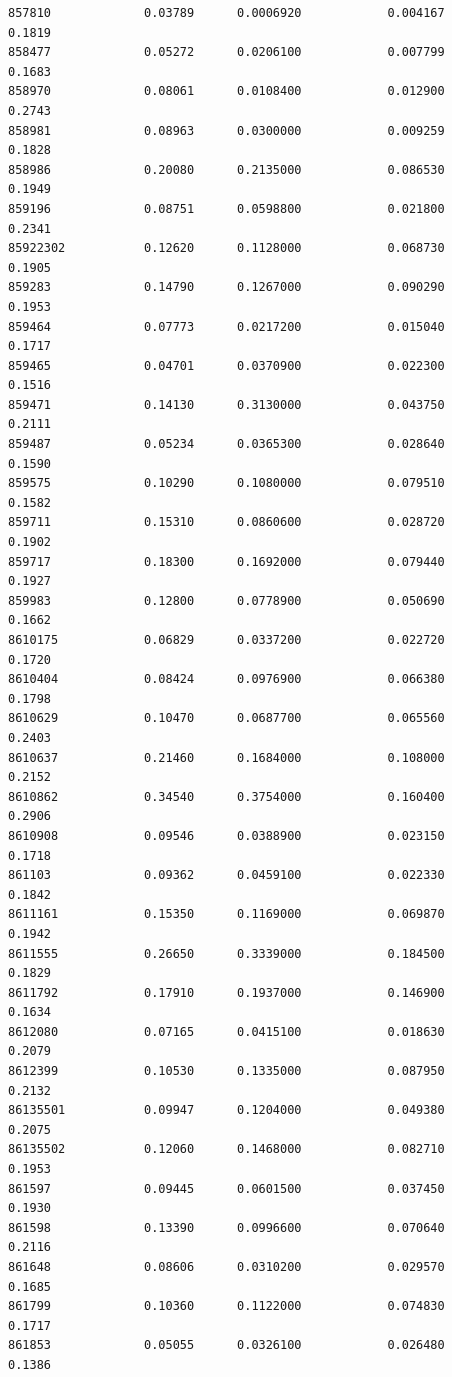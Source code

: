 \documentclass[
  letterpaper,
  DIV=11,
  numbers=noendperiod]{scrartcl}
\begin{document}
\begin{verbatim}
857810             0.03789      0.0006920            0.004167        0.1819
858477             0.05272      0.0206100            0.007799        0.1683
858970             0.08061      0.0108400            0.012900        0.2743
858981             0.08963      0.0300000            0.009259        0.1828
858986             0.20080      0.2135000            0.086530        0.1949
859196             0.08751      0.0598800            0.021800        0.2341
85922302           0.12620      0.1128000            0.068730        0.1905
859283             0.14790      0.1267000            0.090290        0.1953
859464             0.07773      0.0217200            0.015040        0.1717
859465             0.04701      0.0370900            0.022300        0.1516
859471             0.14130      0.3130000            0.043750        0.2111
859487             0.05234      0.0365300            0.028640        0.1590
859575             0.10290      0.1080000            0.079510        0.1582
859711             0.15310      0.0860600            0.028720        0.1902
859717             0.18300      0.1692000            0.079440        0.1927
859983             0.12800      0.0778900            0.050690        0.1662
8610175            0.06829      0.0337200            0.022720        0.1720
8610404            0.08424      0.0976900            0.066380        0.1798
8610629            0.10470      0.0687700            0.065560        0.2403
8610637            0.21460      0.1684000            0.108000        0.2152
8610862            0.34540      0.3754000            0.160400        0.2906
8610908            0.09546      0.0388900            0.023150        0.1718
861103             0.09362      0.0459100            0.022330        0.1842
8611161            0.15350      0.1169000            0.069870        0.1942
8611555            0.26650      0.3339000            0.184500        0.1829
8611792            0.17910      0.1937000            0.146900        0.1634
8612080            0.07165      0.0415100            0.018630        0.2079
8612399            0.10530      0.1335000            0.087950        0.2132
86135501           0.09947      0.1204000            0.049380        0.2075
86135502           0.12060      0.1468000            0.082710        0.1953
861597             0.09445      0.0601500            0.037450        0.1930
861598             0.13390      0.0996600            0.070640        0.2116
861648             0.08606      0.0310200            0.029570        0.1685
861799             0.10360      0.1122000            0.074830        0.1717
861853             0.05055      0.0326100            0.026480        0.1386

\end{verbatim}
\end{document}
